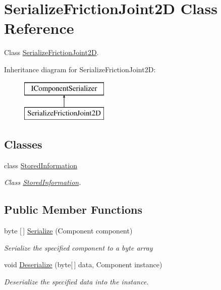 \hypertarget{class_serialize_friction_joint2_d}{}\section{Serialize\+Friction\+Joint2D Class Reference}
\label{class_serialize_friction_joint2_d}


Class \hyperlink{class_serialize_friction_joint2_d}{Serialize\+Friction\+Joint2D}.  


Inheritance diagram for Serialize\+Friction\+Joint2D\+:\begin{figure}[H]
\begin{center}
\leavevmode
\includegraphics[height=2.000000cm]{class_serialize_friction_joint2_d}
\end{center}
\end{figure}
\subsection*{Classes}
\begin{DoxyCompactItemize}
\item 
class \hyperlink{class_serialize_friction_joint2_d_1_1_stored_information}{Stored\+Information}
\begin{DoxyCompactList}\small\item\em Class \hyperlink{class_serialize_friction_joint2_d_1_1_stored_information}{Stored\+Information}. \end{DoxyCompactList}\end{DoxyCompactItemize}
\subsection*{Public Member Functions}
\begin{DoxyCompactItemize}
\item 
byte \mbox{[}$\,$\mbox{]} \hyperlink{class_serialize_friction_joint2_d_a6063f9c73da7ddac92e9da48628f17c1}{Serialize} (Component component)
\begin{DoxyCompactList}\small\item\em Serialize the specified component to a byte array \end{DoxyCompactList}\item 
void \hyperlink{class_serialize_friction_joint2_d_a54d659c051702c28e03ab1d9cb938605}{Deserialize} (byte\mbox{[}$\,$\mbox{]} data, Component instance)
\begin{DoxyCompactList}\small\item\em Deserialize the specified data into the instance. \end{DoxyCompactList}\end{DoxyCompactItemize}


